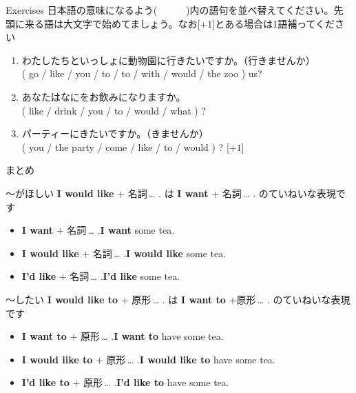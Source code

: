 \documentclass[aspectratio=169,xcolor={dvipsnames,table}]{beamer}
\begin{document}
\begin{frame}[plain]{Exercises}
日本語の意味になるよう(~~~~~~)内の語句を並べ替えてください。先頭に来る語は大文字で始めてましょう。なお[$+1$]とある場合は1語補ってください

 \begin{enumerate}
  \item わたしたちといっしょに動物園に行きたいですか。（行きませんか）\\
( go / like / you / to / to / with / would / the zoo ) us?\\
  \item あなたはなにをお飲みになりますか。\\
( like / drink / you / to / would / what ) ?\\
  \item パーティーにきたいですか。（きませんか）\\
( you / the party / come / like / to / would ) ? [$+1$]\\
 
\end{enumerate}
\hfill{\scriptsize {}}

\end{frame}
\begin{frame}[plain]{まとめ}
 \begin{block}{～がほしい}\small
\textbf{I would like} $+$ 名詞\,\ldots\,\,.\,\,は\,\,\textbf{I want} $+$ 名詞\,\ldots\,\,.\,\,のていねいな表現です
\begin{itemize}[square]\small
 \item \textbf{I want} $+$ 名詞\,\ldots\,\,.\hfill{\scriptsize \textbf{I want} some tea.}
 \item \textbf{I would like} $+$ 名詞\,\ldots\,\,.\hfill{\scriptsize \textbf{I would like} some tea.}
 \item \textbf{I'd like} $+$ 名詞\,\ldots\,\,.\hfill{\scriptsize \textbf{I'd like} some tea.}
       \end{itemize}
\end{block}

\begin{block}{～したい}\small
\textbf{I would like to} $+$ 原形\,\ldots\,\,.\,\,は\,\,\textbf{I want to} $+$原形\,\ldots\,\,.\,\,のていねいな表現です
\begin{itemize}[square]\small
 \item \textbf{I want to} $+$ 原形\,\ldots\,\,.\hfill{\scriptsize \textbf{I want to} have some tea.}
 \item \textbf{I would like to} $+$ 原形\,\ldots\,\,.\hfill{\scriptsize \textbf{I would like to} have some tea.}
 \item \textbf{I'd like to} $+$ 原形\,\ldots\,\,.\hfill{\scriptsize \textbf{I'd like to} have some tea.}
       \end{itemize}
\end{block}
\end{frame}
\end{document}
